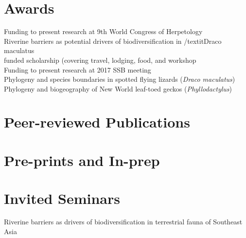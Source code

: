 \documentclass[11pt,a4paper,sans]{moderncv}        %
\begin{document}
\section{Awards}
\small{\tabto{1.25cm}Funding to present research at 9th World Congress of Herpetology} \\
\small{\tabto{1.25cm}Riverine barriers as potential drivers of biodiversification in /textit{Draco maculatus}} \\
\small{\tabto{1.25cm}funded scholarship (covering travel, lodging, food, and workshop} \\
\small{\tabto{1.25cm}Funding to present research at 2017 SSB meeting} \\
\small{\tabto{1.25cm}Phylogeny and species boundaries in spotted flying lizards (\textit{Draco maculatus})} \\
\small{\tabto{1.25cm}Phylogeny and biogeography of New World leaf-toed geckos (\textit{Phyllodactylus})} \\

\section{Peer-reviewed Publications}
\begin{refsection}
\nocite{*}
\printbibliography[heading=none]
\end{refsection}

\section{Pre-prints and In-prep}
\begin{refsection}
\nocite{*}
\printbibliography[heading=none]
\end{refsection}

\section{Invited Seminars}
\small{\tabto{1.25cm}Riverine barriers as drivers of biodiversification in terrestrial fauna of Southeast Asia}
\end{document}
